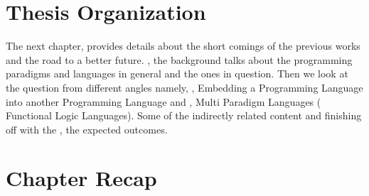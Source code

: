 \documentclass[thesis-solanki.tex]{subfiles}
\begin{document}


\section{Thesis Organization}

The next chapter,  provides details about the short comings of the previous works and the road to a 
better future. , the background talks about the programming paradigms and languages in general and 
the ones in question. Then we look at the question from different angles namely, ,  Embedding a 
Programming Language into another Programming Language and  , Multi Paradigm Languages (
Functional Logic Languages). Some of the indirectly related content  and finishing off with the 
, the expected outcomes.     


\section{Chapter Recap}
\end{document}
